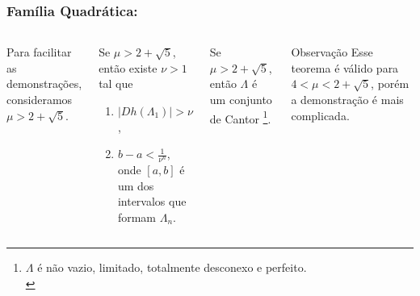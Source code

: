 
\begin{frame}
\vspace{5pt}
\frametitle{Família Quadrática: \subsecname}
\begin{columns}
\column{\dimexpr\paperwidth-15pt}

Para facilitar as demonstrações, consideramos $\mu > 2 + \sqrt{5}$.

\begin{lemma}
Se $\mu > 2 + \sqrt{5}$, então existe $\nu > 1$ tal que
\begin{enumerate}
\item  $|D h(\Lambda_1)| > \nu$,
\item $b - a < \frac{1}{\nu^n}$, onde $[a, b]$ é um dos intervalos que formam $\Lambda_n$.
\end{enumerate}
\end{lemma}

\begin{theorem}
Se $\mu > 2 + \sqrt{5}$, então $\Lambda$ é um conjunto de Cantor \footnote{$\Lambda$ é não vazio, limitado, totalmente desconexo e perfeito.\\}.
\end{theorem}

\begin{block}{Observação}
Esse teorema é válido para $4 < \mu < 2 + \sqrt{5}$, porém a demonstração é mais complicada.
\end{block}

\end{columns}
\end{frame}
